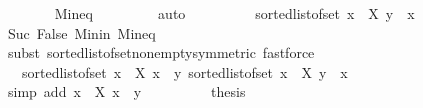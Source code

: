 \begin{isabellebody}
\ \ \ \ \ \ \isamarkupfalse%
\ Min{\isacharunderscore}{\kern0pt}eq\ {}\isanewline
\ \ \ \ \ \ \isamarkupfalse%
\ auto\isanewline
\ \ \ \ \isamarkupfalse%
\ \isamarkupfalse%
\ {\isachardoublequoteopen}{\isasymdots}\ {\isacharequal}{\kern0pt}\ sorted{\isacharunderscore}{\kern0pt}list{\isacharunderscore}{\kern0pt}of{\isacharunderscore}{\kern0pt}set\ {\isacharparenleft}{\kern0pt}{\isacharbraceleft}{\kern0pt}x\ {\isasymin}\ X{\isachardot}{\kern0pt}\ y\ {\isasymle}\ x{\isacharbraceright}{\kern0pt}{\isacharparenright}{\kern0pt}{\isachardoublequoteclose}\ \ \ \ \ \ \isanewline
\ \ \ \ \ \ \isamarkupfalse%
\ Suc\ False\ Min{\isacharunderscore}{\kern0pt}in\ Min{\isacharunderscore}{\kern0pt}eq\isanewline
\ \ \ \ \ \ \isamarkupfalse%
\ {\isacharparenleft}{\kern0pt}subst\ sorted{\isacharunderscore}{\kern0pt}list{\isacharunderscore}{\kern0pt}of{\isacharunderscore}{\kern0pt}set{\isacharunderscore}{\kern0pt}nonempty{\isacharbrackleft}{\kern0pt}symmetric{\isacharbrackright}{\kern0pt}{\isacharparenright}{\kern0pt}\ fastforce{\isacharplus}{\kern0pt}\isanewline
\ \ \ \ \isamarkupfalse%
\ \isamarkupfalse%
\ {\isachardoublequoteopen}{\isasymdots}\ {\isacharequal}{\kern0pt}\ sorted{\isacharunderscore}{\kern0pt}list{\isacharunderscore}{\kern0pt}of{\isacharunderscore}{\kern0pt}set\ {\isacharparenleft}{\kern0pt}{\isacharbraceleft}{\kern0pt}x\ {\isasymin}\ X{\isachardot}{\kern0pt}\ x\ {\isacharless}{\kern0pt}\ y{\isacharbraceright}{\kern0pt}{\isacharparenright}{\kern0pt}{\isacharat}{\kern0pt}\ sorted{\isacharunderscore}{\kern0pt}list{\isacharunderscore}{\kern0pt}of{\isacharunderscore}{\kern0pt}set\ {\isacharparenleft}{\kern0pt}{\isacharbraceleft}{\kern0pt}x\ {\isasymin}\ X{\isachardot}{\kern0pt}\ y\ {\isasymle}\ x{\isacharbraceright}{\kern0pt}{\isacharparenright}{\kern0pt}{\isachardoublequoteclose}\isanewline
\ \ \ \ \ \ \isamarkupfalse%
\ {\isacharparenleft}{\kern0pt}simp\ add{\isacharcolon}{\kern0pt}\ {\isacartoucheopen}{\isacharbraceleft}{\kern0pt}x\ {\isasymin}\ X{\isachardot}{\kern0pt}\ x\ {\isacharless}{\kern0pt}\ y{\isacharbraceright}{\kern0pt}\ {\isacharequal}{\kern0pt}\ {\isacharbraceleft}{\kern0pt}{\isacharbraceright}{\kern0pt}{\isacartoucheclose}{\isacharparenright}{\kern0pt}\isanewline
\ \ \ \ \isamarkupfalse%
\ \isamarkupfalse%
\ {\isacharquery}{\kern0pt}thesis\isacommand{{\isachardot}{\kern0pt}}\isamarkupfalse%
\isanewline
\ \ \isamarkupfalse%
\isanewline
\ \ \isamarkupfalse%

\end{isabellebody}
